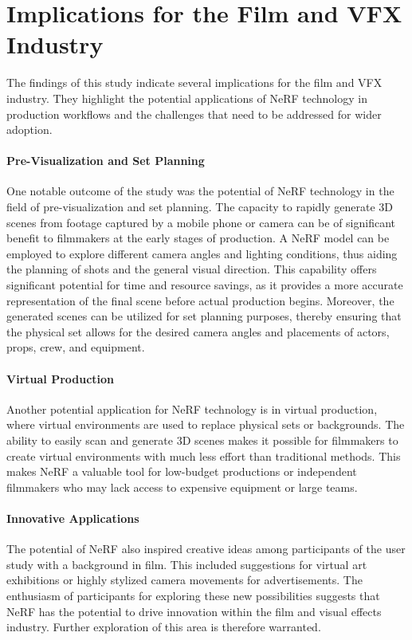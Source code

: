 \section{Implications for the Film and VFX Industry}
\label{sec:discussion:implications}

The findings of this study indicate several implications for the film and VFX industry. 
They highlight the potential applications of NeRF technology in production workflows and the challenges that need to be addressed for wider adoption.

\paragraph{Pre-Visualization and Set Planning}
One notable outcome of the study was the potential of NeRF technology in the field of pre-visualization and set planning.
The capacity to rapidly generate 3D scenes from footage captured by a mobile phone or camera can be of significant benefit to filmmakers at the early stages of production.
A NeRF model can be employed to explore different camera angles and lighting conditions, thus aiding the planning of shots and the general visual direction.
This capability offers significant potential for time and resource savings, as it provides a more accurate representation of the final scene before actual production begins.
Moreover, the generated scenes can be utilized for set planning purposes, thereby ensuring that the physical set allows for the desired camera angles and placements of actors, props, crew, and equipment.

\paragraph{Virtual Production}
Another potential application for NeRF technology is in virtual production, where virtual environments are used to replace physical sets or backgrounds.
The ability to easily scan and generate 3D scenes makes it possible for filmmakers to create virtual environments with much less effort than traditional methods.
This makes NeRF a valuable tool for low-budget productions or independent filmmakers who may lack access to expensive equipment or large teams.

\paragraph{Innovative Applications}
The potential of NeRF also inspired creative ideas among participants of the user study with a background in film.
This included suggestions for virtual art exhibitions or highly stylized camera movements for advertisements.
The enthusiasm of participants for exploring these new possibilities suggests that NeRF has the potential to drive innovation within the film and visual effects industry. Further exploration of this area is therefore warranted.   


